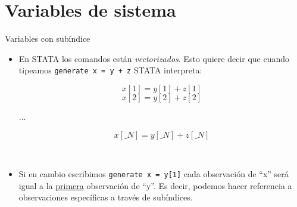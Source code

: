 \documentclass{beamer}
\begin{document}


\section{Variables de sistema}

\begin{frame}{Variables con subíndice}
\begin{itemize}
\item En STATA los comandos están \textit{vectorizados}. Esto quiere decir que cuando tipeamos
\texttt{generate x = y + z} STATA interpreta:\\
{\footnotesize
\[ x[1] = y[1] + z[1]\]
\[ x[2] = y[2] + z[2]\]
\begin{center}
...
\end{center}
\[x[\_N] = y[\_N] + z[\_N]\]}\\
\item Si en cambio escribimos \texttt{generate x = y[1]} cada observación de ``x'' será igual a la \underline{primera} observación de ``y''.  Es decir, podemos hacer referencia a observaciones específicas a través de subíndices.
\end{itemize}
\end{frame}
\end{document}

